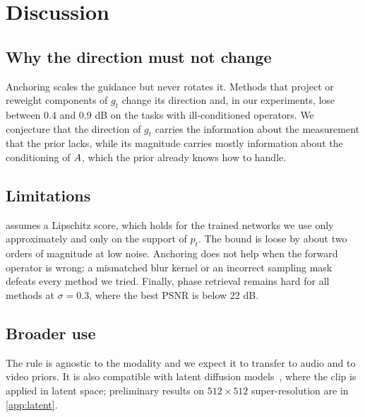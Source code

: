 \section{Discussion}
\label{sec:discussion}
\subsection{Why the direction must not change}
\label{sec:direction}
Anchoring scales the guidance but never rotates it. Methods that project or reweight components of $g_t$ change its direction and, in our experiments, lose between 0.4 and 0.9 dB on the tasks with ill-conditioned operators. We conjecture that the direction of $g_t$ carries the information about the measurement that the prior lacks, while its magnitude carries mostly information about the conditioning of $A$, which the prior already knows how to handle.

\subsection{Limitations}
\label{sec:limitations}
 assumes a Lipschitz score, which holds for the trained networks we use only approximately and only on the support of $p_t$. The bound is loose by about two orders of magnitude at low noise. Anchoring does not help when the forward operator is wrong: a mismatched blur kernel or an incorrect sampling mask defeats every method we tried. Finally, phase retrieval remains hard for all methods at $\sigma = 0.3$, where the best PSNR is below 22 dB.

\subsection{Broader use}
\label{sec:broader}
The rule is agnostic to the modality and we expect it to transfer to audio and to video priors. It is also compatible with latent diffusion models~\cite{rombach2022ldm,rout2023psld}, where the clip is applied in latent space; preliminary results on $512 \times 512$ super-resolution are in \cref{app:latent}.
